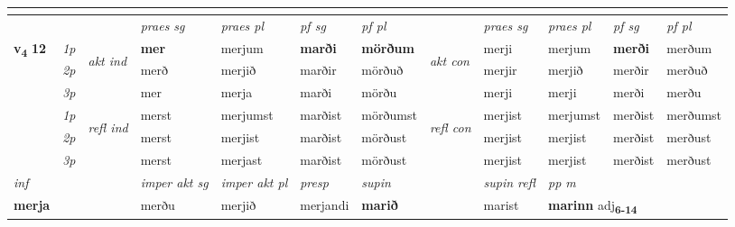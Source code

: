 \begin{longtable}[l]{X>{\footnotesize\itshape}llXXXXlXXXX}
\midrule
   & \\
   \midrule
 & &   & \textit{praes sg}  & \textit{praes pl}    & \textit{ pf sg} & \textit{pf pl} & & \textit{praes sg}  & \textit{praes pl}    & \textit{pf sg} & \textit{pf pl }  \\ \cmidrule{4-7} \cmidrule{9-12}
 \multirow{2}{*}{{{\textbf{v{\textsubscript{4}}} \Large{\textbf{12}}}}}  & 1p & \multirow{3}{*}{\begin{turn}{90}\textit{akt ind}\end{turn}} & \textbf{mer} & merjum & \textbf{marði} & \textbf{mörðum} & \multirow{3}{*}{\begin{turn}{90}\textit{akt con}\end{turn}} &merji & merjum & \textbf{merði} & merðum\\*
 & 2p &  &  merð  & merjið & marðir & mörðuð & & merjir & merjið & merðir & merðuð \\*
 & 3p &  & mer & merja & marði & mörðu & & merji & merji& merði & merðu \\*
\cmidrule{4-7} \cmidrule{9-12}
 & 1p & \multirow{3}{*}{\begin{turn}{90}\textit{refl ind}\end{turn}}  & merst & merjumst & marðist & mörðumst & \multirow{3}{*}{\begin{turn}{90}\textit{refl con}\end{turn}}  &merjist & merjumst & merðist & merðumst \\*
 & 2p &  & merst & merjist & marðist & mörðust & &merjist & merjist & merðist & merðust \\*
 & 3p  & & merst & merjast & marðist & mörðust & & merjist & merjist& merðist & merðust \\*
\cmidrule{4-7} \cmidrule{9-12}

   {\textit{inf}} & &  & \textit{imper akt sg} & \textit{imper akt pl}   & \textit{presp} & \textit{supin} && \textit{supin refl} & \textit{pp m} \\*
  {\textbf{merja}} & && merðu  & merjið   & merjandi &  \textbf{marið} && marist & \multicolumn{2}{l}{\textbf{marinn} adj\textbf{\textsubscript{6-14}}} \\*

\midrule


\end{longtable}

